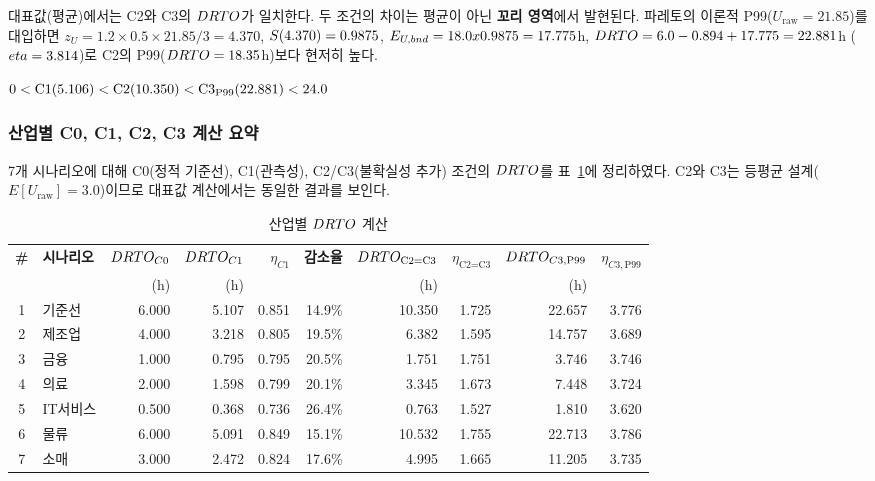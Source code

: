 대표값(평균)에서는 C2와 C3의 $\DRTO$가 일치한다.
두 조건의 차이는 평균이 아닌 \textbf{꼬리 영역}에서 발현된다.
파레토의 이론적 P99($U_{\text{raw}} = 21.85$)를 대입하면
$z_U = 1.2 \times 0.5 \times 21.85/3 = 4.370$,
$S(4.370) = \erf{0.9875}{0.975}$,
$E_{U,bnd} = 18.0 \times \erf{0.9875}{0.975} = \erf{17.775}{17.55}$h,
$\DRTO = 6.0 - 0.894 + \erf{17.775}{17.55} = \erf{22.881}{22.657}$h ($\eta = \erf{3.814}{3.776}$)로
C2의 P99($\DRTO = 18.35$h)보다 현저히 높다.

 $0 < \text{C1}(\erf{5.106}{5.107}) < \text{C2}(10.350) < \text{C3}_{\text{P99}}(\erf{22.881}{22.657}) < 24.0$

\subsubsection{산업별 C0, C1, C2, C3 계산 요약}
\label{app:golden-industry-c1}

7개 시나리오에 대해 C0(정적 기준선), C1(관측성), C2/C3(불확실성 추가) 조건의
$\DRTO$를 \p{[}표~\ref{tab:app-golden-c1-summary}\p{]}에 정리하였다.
C2와 C3는 등평균 설계($E[U_{\text{raw}}] = 3.0$)이므로
대표값 계산에서는 동일한 결과를 보인다.

\begin{table}[htbp]
\centering
\caption{산업별 $\DRTO$ 계산 }
\label{tab:app-golden-c1-summary}
\small
\begin{tabular}{clrrrrrrrr}
\toprule
\textbf{\#} & \textbf{시나리오}
  & \textbf{$\DRTO_{C0}$} & \textbf{$\DRTO_{C1}$} & \textbf{$\eta_{C1}$}
  & \textbf{감소율}
  & \textbf{$\DRTO_{\text{C2=C3}}$} & \textbf{$\eta_{\text{C2=C3}}$}
  & \textbf{$\DRTO_{C3,\text{P99}}$} & \textbf{$\eta_{C3,\text{P99}}$} \\
  & & (h) & (h) & & & (h) & & (h) & \\
\midrule
1 & 기준선    & 6.000 & 5.107 & 0.851 & 14.9\% & 10.350 & 1.725 & 22.657 & 3.776 \\
2 & 제조업    & 4.000 & 3.218 & 0.805 & 19.5\% &  6.382 & 1.595 & 14.757 & 3.689 \\
3 & 금융      & 1.000 & 0.795 & 0.795 & 20.5\% &  1.751 & 1.751 &  3.746 & 3.746 \\
4 & 의료      & 2.000 & 1.598 & 0.799 & 20.1\% &  3.345 & 1.673 &  7.448 & 3.724 \\
5 & IT서비스   & 0.500 & 0.368 & 0.736 & 26.4\% &  0.763 & 1.527 &  1.810 & 3.620 \\
6 & 물류      & 6.000 & 5.091 & 0.849 & 15.1\% & 10.532 & 1.755 & 22.713 & 3.786 \\
7 & 소매      & 3.000 & 2.472 & 0.824 & 17.6\% &  4.995 & 1.665 & 11.205 & 3.735 \\
\bottomrule
\end{tabular}
\end{table}

